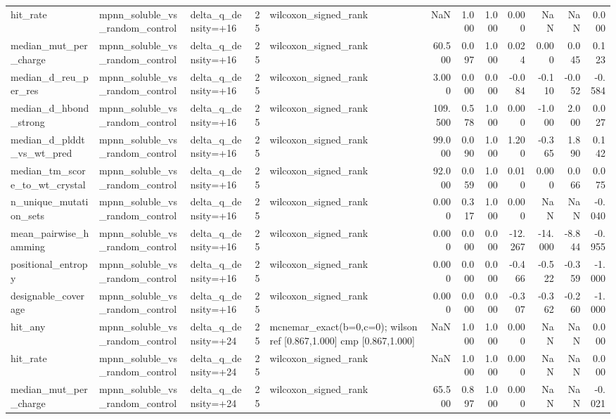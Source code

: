 \begin{table}
{\begin{tabular}{lllrlrrrrrrr}
hit\_rate & mpnn\_soluble\_vs\_random\_control & delta\_q\_density=+16 & 25 & wilcoxon\_signed\_rank & NaN & 1.000 & 1.000 & 0.000 & NaN & NaN & 0.000 \\
median\_mut\_per\_charge & mpnn\_soluble\_vs\_random\_control & delta\_q\_density=+16 & 25 & wilcoxon\_signed\_rank & 60.500 & 0.097 & 1.000 & 0.024 & 0.000 & 0.045 & 0.123 \\
median\_d\_reu\_per\_res & mpnn\_soluble\_vs\_random\_control & delta\_q\_density=+16 & 25 & wilcoxon\_signed\_rank & 3.000 & 0.000 & 0.000 & -0.084 & -0.110 & -0.052 & -0.584 \\
median\_d\_hbond\_strong & mpnn\_soluble\_vs\_random\_control & delta\_q\_density=+16 & 25 & wilcoxon\_signed\_rank & 109.500 & 0.578 & 1.000 & 0.000 & -1.000 & 2.000 & 0.027 \\
median\_d\_plddt\_vs\_wt\_pred & mpnn\_soluble\_vs\_random\_control & delta\_q\_density=+16 & 25 & wilcoxon\_signed\_rank & 99.000 & 0.090 & 1.000 & 1.200 & -0.365 & 1.890 & 0.142 \\
median\_tm\_score\_to\_wt\_crystal & mpnn\_soluble\_vs\_random\_control & delta\_q\_density=+16 & 25 & wilcoxon\_signed\_rank & 92.000 & 0.059 & 1.000 & 0.010 & 0.000 & 0.066 & 0.075 \\
n\_unique\_mutation\_sets & mpnn\_soluble\_vs\_random\_control & delta\_q\_density=+16 & 25 & wilcoxon\_signed\_rank & 0.000 & 0.317 & 1.000 & 0.000 & NaN & NaN & -0.040 \\
mean\_pairwise\_hamming & mpnn\_soluble\_vs\_random\_control & delta\_q\_density=+16 & 25 & wilcoxon\_signed\_rank & 0.000 & 0.000 & 0.000 & -12.267 & -14.000 & -8.844 & -0.955 \\
positional\_entropy & mpnn\_soluble\_vs\_random\_control & delta\_q\_density=+16 & 25 & wilcoxon\_signed\_rank & 0.000 & 0.000 & 0.000 & -0.466 & -0.522 & -0.359 & -1.000 \\
designable\_coverage & mpnn\_soluble\_vs\_random\_control & delta\_q\_density=+16 & 25 & wilcoxon\_signed\_rank & 0.000 & 0.000 & 0.000 & -0.307 & -0.362 & -0.260 & -1.000 \\
hit\_any & mpnn\_soluble\_vs\_random\_control & delta\_q\_density=+24 & 25 & mcnemar\_exact(b=0,c=0); wilson ref [0.867,1.000] cmp [0.867,1.000] & NaN & 1.000 & 1.000 & 0.000 & NaN & NaN & 0.000 \\
hit\_rate & mpnn\_soluble\_vs\_random\_control & delta\_q\_density=+24 & 25 & wilcoxon\_signed\_rank & NaN & 1.000 & 1.000 & 0.000 & NaN & NaN & 0.000 \\
median\_mut\_per\_charge & mpnn\_soluble\_vs\_random\_control & delta\_q\_density=+24 & 25 & wilcoxon\_signed\_rank & 65.500 & 0.897 & 1.000 & 0.000 & NaN & NaN & -0.021 \\

\end{tabular}}
\end{table}
